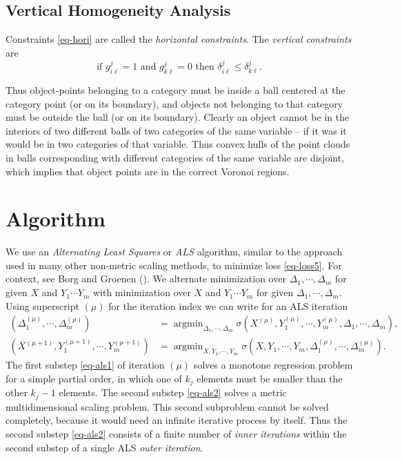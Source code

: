 \documentclass[
  12pt,
  letterpaper,
  DIV=11,
  numbers=noendperiod]{scrartcl}
\newcommand{\sectionbreak}{\clearpage}
\begin{document}
\subsection{Vertical Homogeneity
Analysis}\label{vertical-homogeneity-analysis}

Constraints \eqref{eq-hori} are called the \emph{horizontal
constraints}. The \emph{vertical constraints} are \begin{equation}
  \text{if }g_{i\ell}^j = 1\text{ and }g_{k\ell}^j = 0 \text{ then }\delta_{i\ell}^j \leq \delta_{k\ell}^j.
\end{equation}

Thus object-points belonging to a category must be inside a ball
centered at the category point (or on its boundary), and objects not
belonging to that category must be outside the ball (or on its
boundary). Clearly an object cannot be in the interiors of two different
balls of two categories of the same variable -- if it was it would be in
two categories of that variable. Thus convex hulls of the point clouds
in balls corresponding with different categories of the same variable
are disjoint, which implies that object points are in the correct
Voronoi regions.

\sectionbreak

\section{Algorithm}\label{algorithm}

We use an \emph{Alternating Least Squares} or \emph{ALS} algorithm,
similar to the approach used in many other non-metric scaling methods,
to minimize loss \eqref{eq-loss5}. For context, see Borg and Groenen
(). We alternate minimization over
\(\Delta_1,\cdots,\Delta_m\) for given \(X\) and \(Y_1\cdots Y_m\) with
minimization over \(X\) and \(Y_1\cdots Y_m\) for given
\(\Delta_1,\cdots,\Delta_m\). Using superscript \((\mu)\) for the
iteration index we can write for an ALS iteration \begin{subequations}
  \begin{align}
    (\Delta_1^{(\mu)},\cdots,\Delta_m^{(\mu)})       & = \mathop{\text{argmin}}_{\Delta_1,\cdots,\Delta_m}\sigma(X^{(\mu)},Y_1^{(\mu)},\cdots,Y_m^{(\mu)},\Delta_1,\cdots,\Delta_m),\label{eq-als1} \\
    (X^{(\mu+1)},Y_1^{(\mu+1)},\cdots,Y_m^{(\mu+1)}) & = \mathop{\text{argmin}}_{X,Y_1,\cdots,Y_m}\sigma(X,Y_1,\cdots,Y_m,\Delta_1^{(\mu)},\cdots,\Delta_m^{(\mu)}).\label{eq-als2}
  \end{align}
\end{subequations} The first substep \eqref{eq-als1} of iteration
\((\mu)\) solves a monotone regression problem for a simple partial
order, in which one of \(k_j\) elements must be smaller than the other
\(k_j - 1\) elements. The second substep \eqref{eq-als2} solves a metric
multidimensional scaling problem. This second subproblem cannot be
solved completely, because it would need an infinite iterative process
by itself. Thus the second substep \eqref{eq-als2} consists of a finite
number of \emph{inner iterations} within the second substep of a single
ALS \emph{outer iteration}.
\end{document}
